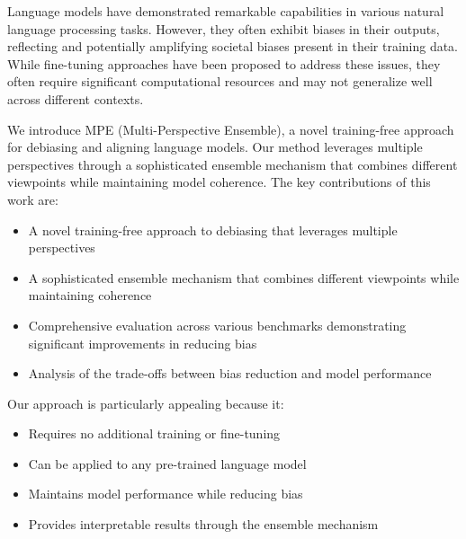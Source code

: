 Language models have demonstrated remarkable capabilities in various natural language processing tasks. However, they often exhibit biases in their outputs, reflecting and potentially amplifying societal biases present in their training data. While fine-tuning approaches have been proposed to address these issues, they often require significant computational resources and may not generalize well across different contexts.

We introduce MPE (Multi-Perspective Ensemble), a novel training-free approach for debiasing and aligning language models. Our method leverages multiple perspectives through a sophisticated ensemble mechanism that combines different viewpoints while maintaining model coherence. The key contributions of this work are:

\begin{itemize}
    \item A novel training-free approach to debiasing that leverages multiple perspectives
    \item A sophisticated ensemble mechanism that combines different viewpoints while maintaining coherence
    \item Comprehensive evaluation across various benchmarks demonstrating significant improvements in reducing bias
    \item Analysis of the trade-offs between bias reduction and model performance
\end{itemize}

Our approach is particularly appealing because it:
\begin{itemize}
    \item Requires no additional training or fine-tuning
    \item Can be applied to any pre-trained language model
    \item Maintains model performance while reducing bias
    \item Provides interpretable results through the ensemble mechanism
\end{itemize} 
